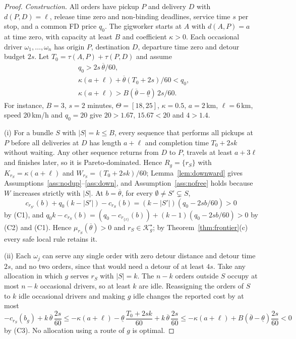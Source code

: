 \documentclass[review,12pt]{elsarticle}
\theoremstyle{definition}
\theoremstyle{remark}
\newcommand{\Kstar}{\mathcal{K}^\star}
\newcommand{\lth}{\underline{\theta}}
\newcommand{\uth}{\overline{\theta}}
\begin{document}
\begin{proof}
\emph{Construction.} All orders have pickup $P$ and delivery $D$ with
$d(P,D)=\ell$, release time zero and non-binding deadlines, service time
$s$ per stop, and a common FD price $q_0$. The gigworker starts at $A$ with
$d(A,P)=a$ at time zero, with capacity at least $B$ and coefficient
$\kappa>0$. Each occasional driver $\omega_1,\dots,\omega_n$ has origin $P$,
destination $D$, departure time zero and detour budget $2s$. Let
$T_0=\tau(A,P)+\tau(P,D)$ and assume
\begin{align}
&q_0>2s\,\uth/60, \tag{C1}\\
&\kappa(a+\ell)+\uth(T_0+2s)/60<q_0, \tag{C2}\\
&\kappa(a+\ell)>B(\uth-\lth)\,2s/60. \tag{C3}
\end{align}
For instance, $B=3$, $s=2$ minutes, $\Theta=[18,25]$, $\kappa=0.5$,
$a=2$\,km, $\ell=6$\,km, speed 20\,km/h and $q_0=20$ give $20>1.67$,
$15.67<20$ and $4>1.4$.

(i) For a bundle $S$ with $|S|=k\le B$, every sequence that performs all
pickups at $P$ before all deliveries at $D$ has length $a+\ell$ and
completion time $T_0+2sk$ without waiting. Any other sequence returns from
$D$ to $P$, travels at least $a+3\ell$ and finishes later, so it is
Pareto-dominated. Hence $R_g=\{r_S\}$ with $K_{r_S}=\kappa(a+\ell)$ and
$W_{r_S}=(T_0+2sk)/60$; Lemma~\ref{lem:downward} gives
Assumptions~\ref{ass:nodup}--\ref{ass:down}, and
Assumption~\ref{ass:nofree} holds because $W$ increases strictly with $|S|$.
At $b=\uth$, for every $\emptyset\ne S'\subsetneq S$,
\[
c_{r_{S'}}(b)+q_0(k-|S'|)-c_{r_S}(b)=(k-|S'|)(q_0-2sb/60)>0
\]
by (C1), and
$q_0k-c_{r_S}(b)=(q_0-c_{r_{\{x\}}}(b))+(k-1)(q_0-2sb/60)>0$ by (C2)
and (C1). Hence $\mu_{r_S}(\uth)>0$ and $r_S\in\Kstar_g$; by
Theorem~\ref{thm:frontier}(c) every safe local rule retains it.

(ii) Each $\omega_j$ can serve any single order with zero detour distance
and detour time $2s$, and no two orders, since that would need a detour of at
least $4s$. Take any allocation in which $g$ serves $r_S$ with $|S|=k$. The
$n-k$ orders outside $S$ occupy at most $n-k$ occasional drivers, so at
least $k$ are idle. Reassigning the orders of $S$ to $k$ idle occasional
drivers and making $g$ idle changes the reported cost by at most
\[
-c_{r_S}(b_g)+k\,\uth\,\frac{2s}{60}\le-\kappa(a+\ell)-\lth\,\frac{T_0+2sk}{60}+k\,\uth\,\frac{2s}{60}
\le-\kappa(a+\ell)+B(\uth-\lth)\frac{2s}{60}<0
\]
by (C3). No allocation using a route of $g$ is optimal.
\end{proof}
\end{document}
